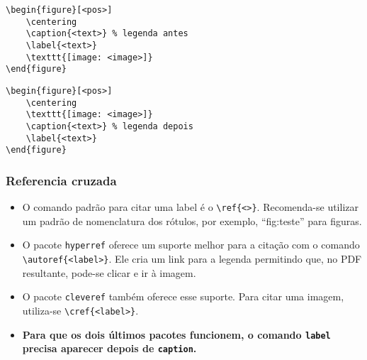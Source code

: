 \documentclass[brazilian]{beamer}
\begin{document}
\begin{frame}[fragile]
    \begin{lstlisting}[style=myStyleLatex]
\begin{figure}[<pos>]
    \centering
    \caption{<text>} % legenda antes
    \label{<text>}
    \texttt{[image: <image>]}
\end{figure}
\end{lstlisting}

\end{frame}

\begin{frame}[fragile]

    \begin{lstlisting}[style=myStyleLatex]
\begin{figure}[<pos>]
    \centering
    \texttt{[image: <image>]}
    \caption{<text>} % legenda depois
    \label{<text>}
\end{figure}
\end{lstlisting}

\end{frame}

\begin{frame}[fragile]
    \frametitle{Referencia cruzada}
    \begin{itemize}
        \item O comando padrão para citar uma label é o \lstinline[style=myStyleLatex]!\ref{<>}!. Recomenda-se utilizar um padrão de nomenclatura dos rótulos, por exemplo, ``fig:teste'' para figuras.
        \item O pacote \texttt{hyperref} oferece um suporte melhor para a citação com o comando \lstinline[style=myStyleLatex]!\autoref{<label>}!. Ele cria um link para a legenda permitindo que, no PDF resultante, pode-se clicar e ir à imagem.
        \item O pacote \texttt{cleveref} também oferece esse suporte. Para citar uma imagem, utiliza-se \lstinline[style=myStyleLatex]!\cref{<label>}!.
        \item \textbf{Para que os dois últimos pacotes funcionem, o comando \texttt{label} precisa aparecer depois de \texttt{caption}.}
    \end{itemize}
\end{frame}
\end{document}
